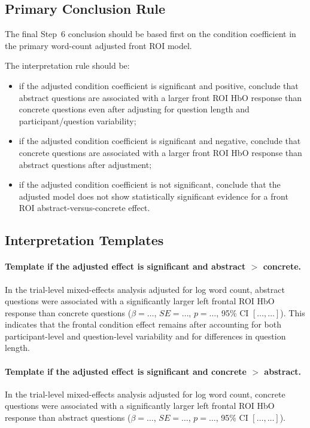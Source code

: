 \documentclass[11pt]{article}
\begin{document}
\subsection{Primary Conclusion Rule}
The final Step~6 conclusion should be based first on the condition coefficient in the
primary word-count adjusted front ROI model.

The interpretation rule should be:
\begin{itemize}
    \item if the adjusted condition coefficient is significant and positive, conclude that abstract
    questions are associated with a larger front ROI HbO response than concrete questions even after
    adjusting for question length and participant/question variability;
    \item if the adjusted condition coefficient is significant and negative, conclude that concrete
    questions are associated with a larger front ROI HbO response than abstract questions after adjustment;
    \item if the adjusted condition coefficient is not significant, conclude that the adjusted model
    does not show statistically significant evidence for a front ROI abstract-versus-concrete effect.
\end{itemize}

\subsection{Interpretation Templates}

\paragraph{Template if the adjusted effect is significant and abstract \(>\) concrete.}
In the trial-level mixed-effects analysis adjusted for log word count, abstract questions were
associated with a significantly larger left frontal ROI HbO response than concrete questions
(\(\beta=\ldots\), \(SE=\ldots\), \(p=\ldots\), 95\% CI \([\ldots,\ldots]\)).
This indicates that the frontal condition effect remains after accounting for both participant-level
and question-level variability and for differences in question length.

\paragraph{Template if the adjusted effect is significant and concrete \(>\) abstract.}
In the trial-level mixed-effects analysis adjusted for log word count, concrete questions were
associated with a significantly larger left frontal ROI HbO response than abstract questions
(\(\beta=\ldots\), \(SE=\ldots\), \(p=\ldots\), 95\% CI \([\ldots,\ldots]\)).
\end{document}
